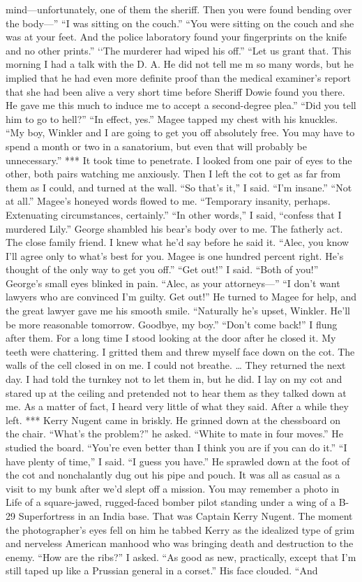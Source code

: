 \documentclass{novel}
\begin{document}
mind—unfortunately, one of them the sheriff. Then you were found bending over the body—” “I was sitting on the couch.” “You were sitting on the couch and she was at your feet. And the police laboratory found your fingerprints on the knife and no other prints.” ‘‘The murderer had wiped his off.” “Let us grant that. This morning I had a talk with the D. A. He did not tell me m so many words, but he implied that he had even more definite proof than the medical examiner’s report that she had been alive a very short time before Sheriff Dowie found you there. He gave me this much to induce me to accept a second-degree plea.” “Did you tell him to go to hell?” “In effect, yes.” Magee tapped my chest with his knuckles. “My boy, Winkler and I are going to get you off absolutely free. You may have to spend a month or two in a sanatorium, but even that will probably be unnecessary.” *** It took time to penetrate. I looked from one pair of eyes to the other, both pairs watching me anxiously. Then I left the cot to get as far from them as I could, and turned at the wall. “So that’s it,” I said. “I’m insane.” “Not at all.” Magee’s honeyed words flowed to me. “Temporary insanity, perhaps. Extenuating circumstances, certainly.” “In other words,” I said, “confess that I murdered Lily.” George shambled his bear’s body over to me. The fatherly act. The close family friend. I knew what he’d say before he said it. “Alec, you know I’ll agree only to what’s best for you. Magee is one hundred percent right. He’s thought of the only way to get you off.” “Get out!” I said. “Both of you!” George’s small eyes blinked in pain. “Alec, as your attorneys—” “I don’t want lawyers who are convinced I’m guilty. Get out!” He turned to Magee for help, and the great lawyer gave me his smooth smile. “Naturally he’s upset, Winkler. He’ll be more reasonable tomorrow. Goodbye, my boy.” “Don’t come back!” I flung after them. For a long time I stood looking at the door after he closed it. My teeth were chattering. I gritted them and threw myself face down on the cot. The walls of the cell closed in on me. I could not breathe. … They returned the next day. I had told the turnkey not to let them in, but he did. I lay on my cot and stared up at the ceiling and pretended not to hear them as they talked down at me. As a matter of fact, I heard very little of what they said. After a while they left. *** Kerry Nugent came in briskly. He grinned down at the chessboard on the chair. “What’s the problem?” he asked. “White to mate in four moves.” He studied the board. “You’re even better than I think you are if you can do it.” “I have plenty of time,” I said. “I guess you have.” He sprawled down at the foot of the cot and nonchalantly dug out his pipe and pouch. It was all as casual as a visit to my bunk after we’d slept off a mission. You may remember a photo in Life of a square-jawed, rugged-faced bomber pilot standing under a wing of a B-29 Superfortress in an India base. That was Captain Kerry Nugent. The moment the photographer’s eyes fell on him he tabbed Kerry as the idealized type of grim and nerveless American manhood who was bringing death and destruction to the enemy. “How are the ribs?” I asked. “As good as new, practically, except that I’m still taped up like a Prussian general in a corset.” His face clouded. “And 
\end{document}
